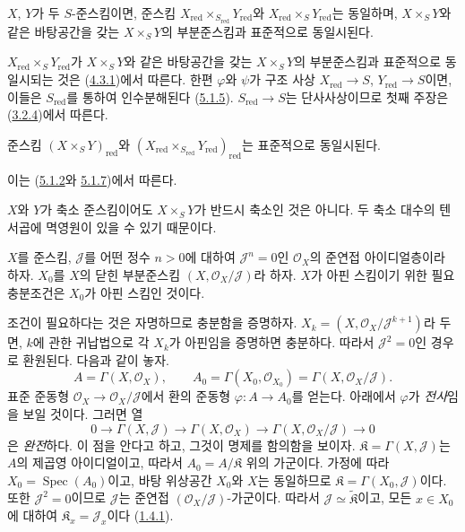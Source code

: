 \begin{proposition}[5.1.7]
\label{I.5.1.7-ko}
$X$, $Y$가 두 $S$-준스킴이면, 준스킴
$X_{\mathrm{red}}\times_{S_{\mathrm{red}}}Y_{\mathrm{red}}$와
$X_{\mathrm{red}}\times_S Y_{\mathrm{red}}$는 동일하며,
$X\times_S Y$와 같은 바탕공간을 갖는 $X\times_S Y$의 부분준스킴과 표준적으로
동일시된다.
\end{proposition}

$X_{\mathrm{red}}\times_S Y_{\mathrm{red}}$가 $X\times_S Y$와 같은
바탕공간을 갖는 $X\times_S Y$의 부분준스킴과 표준적으로 동일시되는 것은
(\hyperref[I.4.3.1-ko]{4.3.1})에서 따른다. 한편 $\varphi$와 $\psi$가
구조 사상 $X_{\mathrm{red}}\to S$, $Y_{\mathrm{red}}\to S$이면, 이들은
$S_{\mathrm{red}}$를 통하여 인수분해된다
(\hyperref[I.5.1.5-ko]{5.1.5}). $S_{\mathrm{red}}\to S$는
단사사상이므로 첫째 주장은 (\hyperref[I.3.2.4-ko]{3.2.4})에서
따른다.

\begin{corollary}[5.1.8]
\label{I.5.1.8-ko}
준스킴 $(X\times_S Y)_{\mathrm{red}}$와
$(X_{\mathrm{red}}\times_{S_{\mathrm{red}}}Y_{\mathrm{red}})_{\mathrm{red}}$는
표준적으로 동일시된다.
\end{corollary}

이는 (\hyperref[I.5.1.2-ko]{5.1.2}와
\hyperref[I.5.1.7-ko]{5.1.7})에서 따른다.

$X$와 $Y$가 축소 준스킴이어도 $X\times_S Y$가 반드시 축소인 것은
아니다. 두 축소 대수의 텐서곱에 멱영원이 있을 수 있기 때문이다.

\begin{proposition}[5.1.9]
\label{I.5.1.9-ko}
$X$를 준스킴, $\mathscr{J}$를 어떤 정수 $n>0$에 대하여
$\mathscr{J}^n=0$인 $\mathscr{O}_X$의 준연접 아이디얼층이라 하자.
$X_0$를 $X$의 닫힌 부분준스킴
$(X,\mathscr{O}_X/\mathscr{J})$라 하자. $X$가 아핀 스킴이기 위한
필요충분조건은 $X_0$가 아핀 스킴인 것이다.
\end{proposition}

조건이 필요하다는 것은 자명하므로 충분함을 증명하자.
$X_k=(X,\mathscr{O}_X/\mathscr{J}^{k+1})$라 두면, $k$에 관한 귀납법으로
각 $X_k$가 아핀임을 증명하면 충분하다. 따라서 $\mathscr{J}^2=0$인
경우로 환원된다. 다음과 같이 놓자.
\[
  A=\Gamma(X,\mathscr{O}_X),\qquad
  A_0=\Gamma(X_0,\mathscr{O}_{X_0})
      =\Gamma(X,\mathscr{O}_X/\mathscr{J}).
\]
표준 준동형 $\mathscr{O}_X\to\mathscr{O}_X/\mathscr{J}$에서 환의
준동형 $\varphi:A\to A_0$를 얻는다. 아래에서 $\varphi$가
\emph{전사}임을 보일 것이다. 그러면 열
\[
  0\to\Gamma(X,\mathscr{J})\to\Gamma(X,\mathscr{O}_X)
  \to\Gamma(X,\mathscr{O}_X/\mathscr{J})\to 0
  \tag{5.1.9.1}\label{I.5.1.9.1-ko}
\]
은 \emph{완전}하다. 이 점을 안다고 하고, 그것이 명제를 함의함을
보이자. $\mathfrak{K}=\Gamma(X,\mathscr{J})$는 $A$의 제곱영
아이디얼이고, 따라서 $A_0=A/\mathfrak{K}$ 위의 가군이다. 가정에
따라 $X_0=\operatorname{Spec}(A_0)$이고, 바탕 위상공간 $X_0$와 $X$는
동일하므로 $\mathfrak{K}=\Gamma(X_0,\mathscr{J})$이다. 또한
$\mathscr{J}^2=0$이므로 $\mathscr{J}$는 준연접
$(\mathscr{O}_X/\mathscr{J})$-가군이다. 따라서
$\mathscr{J}\simeq\widetilde{\mathfrak{K}}$이고, 모든 $x\in X_0$에
대하여 $\mathfrak{K}_x=\mathscr{J}_x$이다
(\hyperref[I.1.4.1-ko]{1.4.1}).

